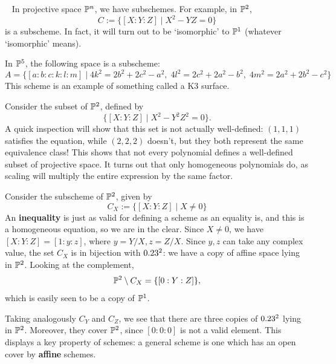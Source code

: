 \begin{example}~\label{P1=x^2-yz}
    In projective space $\P^n$, we have subschemes. For example, in $\P^2$,
    \[
    C:=\{[X:Y:Z] \mid X^2-YZ=0\}
    \]
    is a subscheme. In fact, it will turn out to be `isomorphic' to $\P^1$ (whatever `isomorphic' means).
  \end{example}    
\begin{example}
  In $\P^5$, the following space is a subscheme:
    \[
    A=\{[a:b:c:k:l:m] \mid 4k^2=2b^2+2c^2-a^2, \; 4l^2=2c^2+2a^2-b^2, \; 4m^2=2a^2+2b^2-c^2\}
    \]
    This scheme is an example of something called a K3 surface.
\end{example}
\begin{nonexample}
    Consider the subset of $\P^2$, defined by
    \[
    \{[X:Y:Z] \mid X^2-Y^2Z^2=0\}.
    \]
    A quick inspection will show that this set is not actually well-defined: $(1,1,1)$ satisfies the equation, while $(2,2,2)$ doesn't, but they both represent the same equivalence class! This shows that not every polynomial defines a well-defined subset of projective space. It turns out that only homogeneous polynomials do, as scaling will multiply the entire expression by the same factor.
\end{nonexample}
\begin{example}
    Consider the subscheme of $\P^2$, given by
    \[
    C_X:=\{[X:Y:Z] \mid X\ne 0\}
    \]
    An \textbf{inequality} is just as valid for defining a scheme as an equality is, and this is a homogeneous equation, so we are in the clear. Since $X\ne0$, we have $[X:Y:Z]=[1:y:z]$, where $y=Y/X,z=Z/X$. Since $y,z$ can take any complex value, the set $C_X$ is in bijection with $\A^2$: we have a copy of affine space lying in $\P^2$. Looking at the complement,
    \[
    \P^2\setminus C_X=\{[0:Y:Z]\},
    \]
    which is easily seen to be a copy of $\P^1$.
    
    Taking analogously $C_Y$ and $C_Z$, we see that there are three copies of $\A^2$ lying in $\P^2$. Moreover, they cover $\P^2$, since $[0:0:0]$ is not a valid element. This displays a key property of schemes: a general scheme is one which has an open cover by \textbf{affine} schemes.
\end{example}
